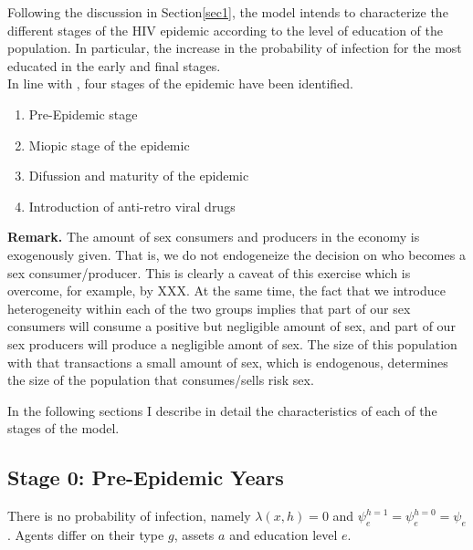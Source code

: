 Following the discussion in Section\ref{sec1}, the model intends to characterize the different stages of the HIV epidemic according to the level of education of the population. In particular, the increase in the probability of infection for the most educated in the early and final stages.\\
In line with \cite{raul}, four stages of the epidemic have been identified.
\begin{enumerate}
\item Pre-Epidemic stage
\item Miopic stage of the epidemic
\item Difussion and maturity of the epidemic
\item Introduction of anti-retro viral drugs
\end{enumerate}

\noindent \textbf{Remark.} The amount of sex consumers and producers in the economy is exogenously given. That is, we do not endogeneize the decision on who becomes a sex consumer/producer. This is clearly a caveat of this exercise which is overcome, for example, by XXX. At the same time, the fact that we introduce heterogeneity within each of the two groups implies that part of our sex consumers will consume a positive but negligible amount of sex, and part of our sex producers will produce a negligible amont of sex. The size of this population with that transactions a small amount of sex, which is endogenous, determines the size of the population that consumes/sells risk sex.

In the following sections I describe in detail the characteristics of each of the stages of the model.

\clearpage
\subsection*{\sf Stage 0: Pre-Epidemic Years}\label{sec:stage1}
There is no probability of infection, namely $\lambda(x,h)=0$ and $\psi_{e}^{h=1}=\psi_{e}^{h=0}=\psi_{e}$. Agents differ on their type $g$, assets $a$ and education level $e$.

